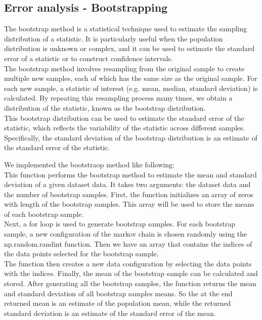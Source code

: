 \documentclass[%
reprint,
 amsmath,amssymb,
 aps,
]{revtex4-2}
\begin{document}
\subsection{Error analysis - Bootstrapping}
The bootstrap method is a statistical technique used to estimate the sampling distribution of a statistic. It is particularly useful when the population distribution is unknown or complex, and it can be used to estimate the standard error of a statistic or to construct confidence intervals. \\
The bootstrap method involves resampling from the original sample to create multiple new samples, each of which has the same size as the original sample. For each new sample, a statistic of interest (e.g. mean, median, standard deviation) is calculated. By repeating this resampling process many times, we obtain a distribution of the statistic, known as the bootstrap distribution. \\
This bootstrap distribution can be used to estimate the standard error of the statistic, which reflects the variability of the statistic across different samples. Specifically, the standard deviation of the bootstrap distribution is an estimate of the standard error of the statistic.

We implemented the bootstraop method like following: \\
This function performs the bootstrap method to estimate the mean and standard deviation of a given dataset data. It takes two arguments: the dataset data and the number of bootstrap samples.
First, the function initializes an array of zeros with length of the bootstrap samples. This array will be used to store the means of each bootstrap sample. \\
Next, a for loop is used to generate bootstrap samples. For each bootstrap sample, a new configuration of the markov chain is chosen randomly using the np.random.randint function. Then we have an array that contains the indices of the data points selected for the bootstrap sample. \\
The function then creates a new data configuration by selecting the data points with the indices.
Finally, the mean of the bootstrap sample can be calculated and stored.
After generating all the bootstrap samples, the function returns the mean and standard deviation of all bootstrap samples means. So the at the end returned mean is an estimate of the population mean, while the returned standard deviation is an estimate of the standard error of the mean.
\end{document}
